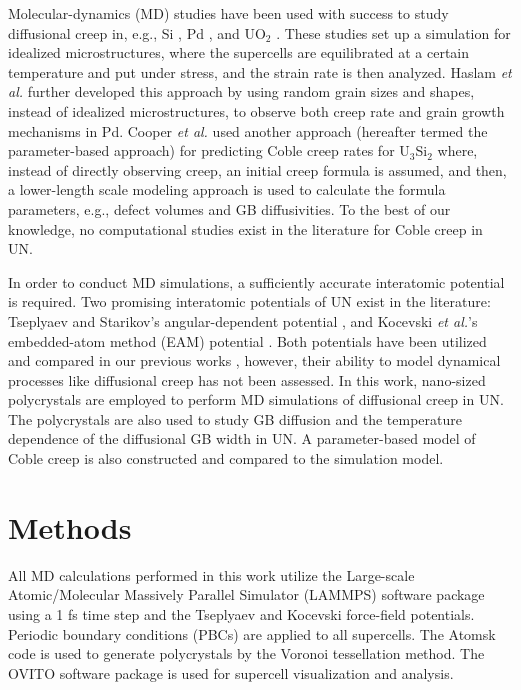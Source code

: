 \documentclass[preprint,12pt,sort&compress]{elsarticle}
\newcommand{\?}{\stackrel{?}{=}}
\begin{document}

Molecular-dynamics (MD) studies have been used with success to study diffusional creep in, e.g., Si \cite{Keblinski1998}, Pd \cite{Yamakov2002}, and UO$_2$ \cite{Desai2008, Galvin2025}. These studies set up a simulation for idealized microstructures, where the supercells are equilibrated at a certain temperature and put under stress, and the strain rate is then analyzed. Haslam \textit{et al.} \cite{Haslam2004} further developed this approach by using random grain sizes and shapes, instead of idealized microstructures, to observe both creep rate and grain growth mechanisms in Pd. Cooper \textit{et al.} \cite{Cooper2021} used another approach (hereafter termed the parameter-based approach) for predicting Coble creep rates for U$_3$Si$_2$ where, instead of directly observing creep, an initial creep formula is assumed, and then, a lower-length scale modeling approach is used to calculate the formula parameters, e.g., defect volumes and GB diffusivities. To the best of our knowledge, no computational studies exist in the literature for Coble creep in UN.

In order to conduct MD simulations, a sufficiently accurate interatomic potential is required. Two promising interatomic potentials of UN exist in the literature: Tseplyaev and Starikov's angular-dependent potential \cite{Tseplyaev2016}, and Kocevski \textit{et al.}'s embedded-atom method (EAM) potential \cite{Kocevski2022II}. Both potentials have been utilized and compared in our previous works \cite{AbdulHameed2024, AbdulHameed2024b}, however, their ability to model dynamical processes like diffusional creep has not been assessed. In this work, nano-sized polycrystals are employed to perform MD simulations of diffusional creep in UN. The polycrystals are also used to study GB diffusion and the temperature dependence of the diffusional GB width in UN. A parameter-based model of Coble creep is also constructed and compared to the simulation model. %

\section{Methods}

All MD calculations performed in this work utilize the Large-scale Atomic/Molecular Massively Parallel Simulator (LAMMPS) software package \cite{Thompson2022} using a 1 fs time step and the Tseplyaev \cite{Tseplyaev2016} and Kocevski \cite{Kocevski2022II} force-field potentials. Periodic boundary conditions (PBCs) are applied to all supercells. The Atomsk code \cite{Hirel2015} is used to generate polycrystals by the Voronoi tessellation method. The OVITO software package \cite{Stukowski2010} is used for supercell visualization and analysis. 
\end{document}
